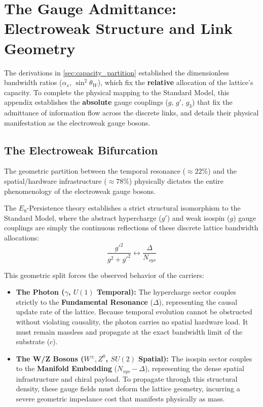 \section{The Gauge Admittance: Electroweak Structure and Link Geometry}
\label{app:gauge_admittance}

The derivations in \cref{sec:capacity_partition} established the dimensionless bandwidth ratios ($\alpha_s$, $\sin^2\theta_W$), which fix the \textbf{relative} allocation of the lattice's capacity. To complete the physical mapping to the Standard Model, this appendix establishes the \textbf{absolute} gauge couplings ($g$, $g'$, $g_3$) that fix the admittance of information flow across the discrete links, and details their physical manifestation as the electroweak gauge bosons.

\subsection{The Electroweak Bifurcation}

The geometric partition between the temporal resonance ($\approx 22\%$) and the spatial/hardware infrastructure ($\approx 78\%$) physically dictates the entire phenomenology of the electroweak gauge bosons. 

The $E_8$-Persistence theory establishes a strict structural isomorphism to the Standard Model, where the abstract hypercharge ($g'$) and weak isospin ($g$) gauge couplings are simply the continuous reflections of these discrete lattice bandwidth allocations:
\begin{equation}
\frac{g'^2}{g^2 + g'^2} \longleftrightarrow \frac{\Delta}{N_{sys}}
\end{equation}

This geometric split forces the observed behavior of the carriers:
\begin{itemize}
    \item \textbf{The Photon ($\gamma$, $U(1)$ Temporal):} The hypercharge sector couples strictly to the \textbf{Fundamental Resonance} ($\Delta$), representing the causal update rate of the lattice. Because temporal evolution cannot be obstructed without violating causality, the photon carries no spatial hardware load. It must remain massless and propagate at the exact bandwidth limit of the substrate ($c$).
    
    \item \textbf{The W/Z Bosons ($W^{\pm}, Z^0$, $SU(2)$ Spatial):} The isospin sector couples to the \textbf{Manifold Embedding} ($N_{sys} - \Delta$), representing the dense spatial infrastructure and chiral payload. To propagate through this structural density, these gauge fields must deform the lattice geometry, incurring a severe geometric impedance cost that manifests physically as mass.
\end{itemize}


